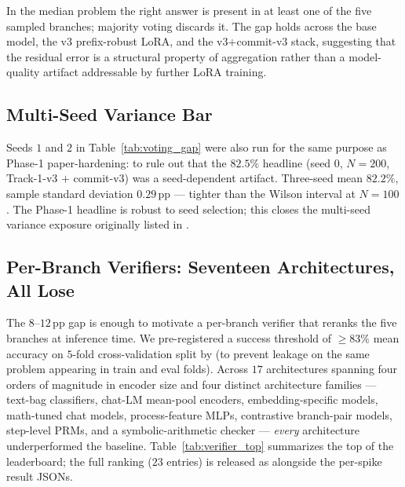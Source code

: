In the median problem the right answer is present in at least one of
the five sampled branches; majority voting discards it.  The gap
holds across the base model, the v3 prefix-robust LoRA, and the
v3$+$commit-v3 stack, suggesting that the residual error is a
structural property of \cmaj{} aggregation rather than a model-quality
artifact addressable by further LoRA training.

\subsection{Multi-Seed Variance Bar}
\label{subsec:multiseed}

Seeds $1$ and $2$ in Table~\ref{tab:voting_gap} were also run for the
same purpose as Phase-1 paper-hardening: to rule out that the
$82.5\%$ \cmajc{} headline (seed $0$, $N{=}200$, Track-1-v3 $+$
commit-v3) was a seed-dependent artifact.  Three-seed mean
$\mathbf{82.2\%}$, sample standard deviation $\mathbf{0.29}$\,pp ---
tighter than the Wilson interval at $N{=}100$.  The Phase-1
\cmajc{} headline is robust to seed selection; this closes the
multi-seed variance exposure originally listed in
.

\subsection{Per-Branch Verifiers: Seventeen Architectures, All Lose}
\label{subsec:verifier_negatives}

The $8\text{--}12$\,pp gap is enough to motivate a per-branch
verifier that reranks the five \cmaj{} branches at inference time.
We pre-registered a success threshold of $\geq 83\%$ mean accuracy
on $5$-fold cross-validation split by  (to
prevent leakage on the same problem appearing in train and eval
folds).  Across $17$ architectures spanning four orders of magnitude
in encoder size and four distinct architecture families ---
text-bag classifiers, chat-LM mean-pool encoders, embedding-specific
models, math-tuned chat models, process-feature MLPs, contrastive
branch-pair models, step-level PRMs, and a symbolic-arithmetic
checker --- \emph{every} architecture underperformed the \cmaj{}
baseline.  Table~\ref{tab:verifier_top} summarizes the top of the
leaderboard; the full ranking ($23$ entries) is released as
 alongside the per-spike result JSONs.

